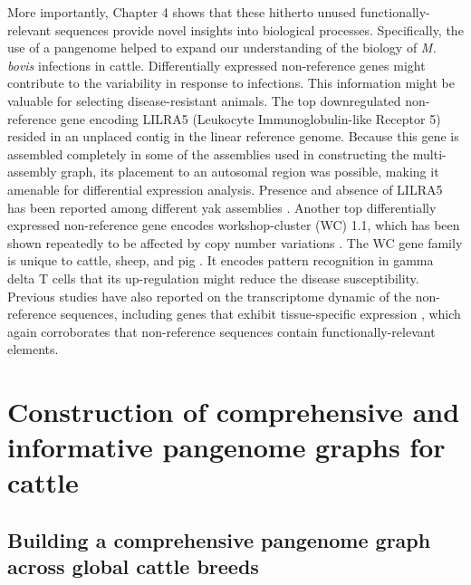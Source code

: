 \documentclass[../main.tex]{subfiles}
\begin{document}
More importantly, Chapter 4 shows that these hitherto unused functionally-relevant sequences provide novel insights into biological processes. Specifically, the use of a pangenome helped to expand our understanding of the biology of \emph{M. bovis} infections in cattle. Differentially expressed non-reference genes might contribute to the variability in response to infections. This information might be valuable for selecting disease-resistant animals. The top downregulated non-reference gene encoding LILRA5 (Leukocyte Immunoglobulin-like Receptor 5) resided in an unplaced contig in the linear reference genome. Because this gene is assembled completely in some of the assemblies used in constructing the multi-assembly graph, its placement to an autosomal region was possible, making it amenable for differential expression analysis. Presence and absence of LILRA5 has been reported among different yak assemblies \citep{ji2021chromosome}. Another top differentially expressed non-reference gene encodes workshop-cluster (WC) 1.1, which has been shown repeatedly to be affected by copy number variations \citep{liu2010analysis,chen2012gene,bickhart2012copy,Low2020}. The WC gene family is unique to cattle, sheep, and pig \citep{bickhart2014challenges}. It encodes pattern recognition in gamma delta T cells that its 
up-regulation might reduce the disease susceptibility. Previous studies have also reported on the transcriptome dynamic of the non-reference sequences, including genes that exhibit tissue-specific expression \citep{wong2018novo,wong2020towards,li2019towards}, which again corroborates that non-reference sequences contain functionally-relevant elements. 

\section[Construction of comprehensive pangenome graphs for cattle]{Construction of comprehensive and informative pangenome graphs for cattle}

\subsection*{Building a comprehensive pangenome graph across global cattle breeds}
\end{document}
